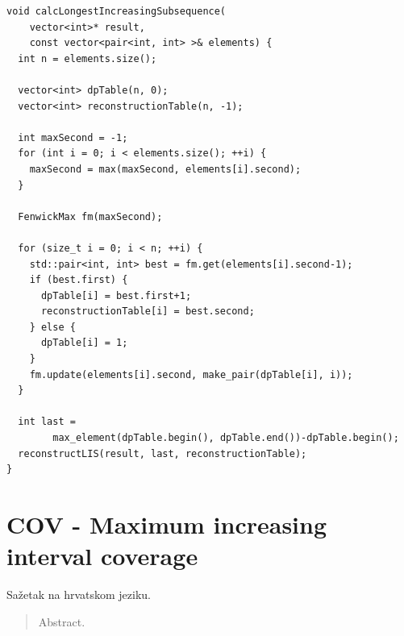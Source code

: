 \documentclass[times, utf8, diplomski]{fer}
\begin{document}
\begin{algorithm}[H]
\begin{lstlisting}
void calcLongestIncreasingSubsequence(
    vector<int>* result,
    const vector<pair<int, int> >& elements) {
  int n = elements.size();

  vector<int> dpTable(n, 0);
  vector<int> reconstructionTable(n, -1);

  int maxSecond = -1;
  for (int i = 0; i < elements.size(); ++i) {
    maxSecond = max(maxSecond, elements[i].second);
  }

  FenwickMax fm(maxSecond);

  for (size_t i = 0; i < n; ++i) {
    std::pair<int, int> best = fm.get(elements[i].second-1);
    if (best.first) {
      dpTable[i] = best.first+1;
      reconstructionTable[i] = best.second;
    } else {
      dpTable[i] = 1;
    }
    fm.update(elements[i].second, make_pair(dpTable[i], i));
  }

  int last = 
        max_element(dpTable.begin(), dpTable.end())-dpTable.begin();
  reconstructLIS(result, last, reconstructionTable);
}
\end{lstlisting}
\end{algorithm}

\section{COV - Maximum increasing interval coverage}

\nocite{Pabinger21012013}
\nocite{Johnson:2008:BAU:1593105.1593117}




\begin{sazetak}
Sažetak na hrvatskom jeziku.

\end{sazetak}

\begin{abstract}
Abstract.

\end{abstract}
\end{document}
